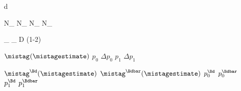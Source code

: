 
\newmathsymbol{\tagdecision}     {d}
\newmathsymbol{\tg}              {\tagdecision}
\newmathsymbol{\mistagestimate}  {\eta}
\newmathsymbol{\deltamistagestimate}{\Delta\mistagestimate}
\newmathsymbol{\mistag}          {\omega}
\newmathsymbol{\deltamistag}     {\Delta\mistag}

\newmathsymbol{\Ntagged}         {N_}
\newmathsymbol{\NRtagged}        {N_}
\newmathsymbol{\NWtagged}        {N_}
\newmathsymbol{\NUtagged}        {N_}

\newmathsymbol{\tageff}          {\eps_}
\newmathsymbol{\efftageff}       {\eps_}
\newmathsymbol{\tagdilution}     {D}
\newmathsymbol{\tagdilutionlg}   {(1-2\mistag)}

\newcommand{\p}[2]                {\ensuremath{p_{#1}^{#2}}\xspace}
\newcommand{\deltap}[2]           {\ensuremath{\Delta p_{#1}^{#2}}\xspace}
\newcommand{\omegaofeta}[1]       {\ensuremath{\mistag^{#1}(\mistagestimate)}\xspace}
\newmathsymbol{\omofeta}          {\omegaofeta{}}
\newmathsymbol{\pzero}            {\p{0}{}}
\newmathsymbol{\deltapzero}       {\deltap{0}{}}
\newmathsymbol{\pone}             {\p{1}{}}
\newmathsymbol{\deltapone}        {\deltap{1}{}}
\newmathsymbol{\avgmistagestimate}{\langle\mistagestimate\rangle}

\newmathsymbol{\omofetaBd}        {\omegaofeta{\Bd}}
\newmathsymbol{\omofetaBdbar}     {\omegaofeta{\Bdbar}}
\newmathsymbol{\pzeroBd}          {\p{0}{\Bd}}
\newmathsymbol{\pzeroBdbar}       {\p{0}{\Bdbar}}
\newmathsymbol{\poneBd}           {\p{1}{\Bd}}
\newmathsymbol{\poneBdbar}        {\p{1}{\Bdbar}}

